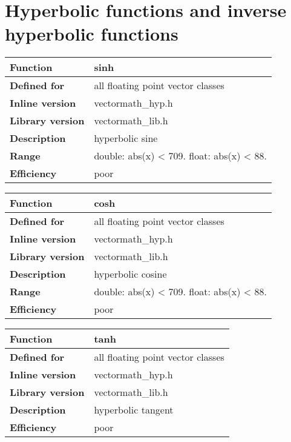 \documentclass[vcl_manual.tex]{subfiles}
\begin{document}
\section{Hyperbolic functions and inverse hyperbolic functions}\label{HyperbolicFunctions}

\begin{tabular}{|p{30mm}|p{120mm}|}
\hline
\bfseries Function & sinh \\ \hline
\bfseries Defined for & all floating point vector classes \\ \hline
\bfseries Inline version & vectormath\_hyp.h \\ \hline
\bfseries Library version & vectormath\_lib.h \\ \hline
\bfseries Description & hyperbolic sine \\ \hline
\bfseries Range & double: abs(x) \textless{} 709. float: abs(x) \textless{} 88. \\ \hline
\bfseries Efficiency & poor \\ \hline
\end{tabular}


\begin{tabular}{|p{30mm}|p{120mm}|}
\hline
\bfseries Function & cosh \\ \hline
\bfseries Defined for & all floating point vector classes \\ \hline
\bfseries Inline version & vectormath\_hyp.h \\ \hline
\bfseries Library version & vectormath\_lib.h \\ \hline
\bfseries Description & hyperbolic cosine \\ \hline
\bfseries Range & double: abs(x) \textless{} 709. float: abs(x) \textless{} 88. \\ \hline
\bfseries Efficiency & poor \\ \hline
\end{tabular}


\begin{tabular}{|p{30mm}|p{120mm}|}
\hline
\bfseries Function & tanh \\ \hline
\bfseries Defined for & all floating point vector classes \\ \hline
\bfseries Inline version & vectormath\_hyp.h \\ \hline
\bfseries Library version & vectormath\_lib.h \\ \hline
\bfseries Description & hyperbolic tangent \\ \hline
\bfseries Efficiency & poor \\ \hline
\end{tabular}
\end{document}
